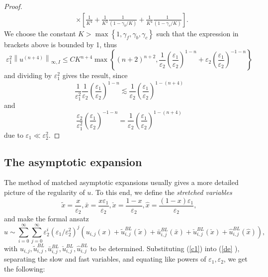 \documentclass[12pt]{article}
\begin{document}
\begin{proof}
$$\begin{aligned}
& \times\left[\frac{1}{K^4}+\frac{1}{K^2} \frac{1}{\left(1-\gamma_b / K\right)}+\frac{1}{K^4} \frac{1}{\left(1-\gamma_c / K\right)}\right].
\end{aligned}
$$
We choose the constant $K>\max \left\{1, \gamma_f, \gamma_b, \gamma_c\right\}$
such that the expression in brackets above is bounded by 1, thus
%
$$
\varepsilon_1^2\left\|u^{(n+4)}\right\|_{\infty, I} \leq C K^{n+4} \max \left\{(n+2)^{n+2}, \frac{1}{\varepsilon_2}\left(\frac{\varepsilon_1}{\varepsilon_2}\right)^{1-n}+\varepsilon_2\left(\frac{\varepsilon_1}{\varepsilon_2}\right)^{-1-n}\right\}
$$
%
and dividing by $\varepsilon_1^2$ gives the result, since
%
$$
\frac{1}{\varepsilon_1^2} \frac{1}{\varepsilon_2}\left(\frac{\varepsilon_1}{\varepsilon_2}\right)^{1-n} \lesssim \frac{1}{\varepsilon_2}\left(\frac{\varepsilon_1}{\varepsilon_2}\right)^{1-(n+4)}
$$
%
and
$$
\frac{\varepsilon_2}{\varepsilon_1^2}\left(\frac{\varepsilon_1}{\varepsilon_2}\right)^{-1-n}=\frac{1}{\varepsilon_2}\left(\frac{\varepsilon_1}{\varepsilon_2}\right)^{1-(n+4)}
$$
due to $\varepsilon_1 \ll \varepsilon_2^2$.

\end{proof}



\subsection{The asymptotic expansion\label{asy}}

The method of matched asymptotic expansions \cite{OM} usually gives a more detailed picture of the regularity of $u$. To this end, we define the \emph{stretched variables} 
$$\tilde{x}=\frac{x}{\varepsilon _{2}},\bar{x}=\frac{x \varepsilon _{1}}{\varepsilon_{2}},\check{x}=\frac{1-x}{\varepsilon _{2}}, \hat{x}=\frac{(1-x) \varepsilon _{1}}{\varepsilon _{2}},
$$
and make the formal ansatz 
\begin{equation}
u\sim \sum_{i=0}^{\infty }\sum_{j=0}^{\infty }\varepsilon
_{2}^{i}(\varepsilon _{1}/\varepsilon _{2}^{2})^{j}\left( u_{i,j}(x)+\tilde{u%
}_{i,j}^{BL}(\tilde{x})+\bar{u}_{i,j}^{BL}(\bar{x})+\check{u}_{i,j}^{BL}(%
\check{x})+\hat{u}_{i,j}^{BL}(\hat{x})\right) ,  \label{c1}
\end{equation}%
with $u_{i,j},\tilde{u}_{i,j}^{BL},\bar{u}_{i,j}^{BL},\check{u}_{i,j}^{BL},%
\hat{u}_{i,j}^{BL}$ to be determined. Substituting (\ref{c1}) into (\ref{de}%
), separating the slow and fast variables, and equating like powers of $%
\varepsilon _{1},\varepsilon _{2}$, we get the following:
\end{document}
